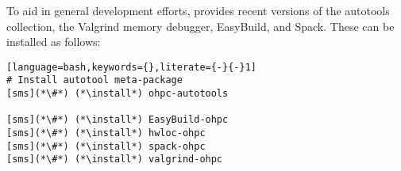 To aid in general development efforts, \OHPC{} provides recent versions of the \GNU{}
autotools collection, the Valgrind memory debugger, EasyBuild, and Spack. These can be installed as follows:

\begin{lstlisting}[language=bash,keywords={},literate={-}{-}1]
# Install autotool meta-package
[sms](*\#*) (*\install*) ohpc-autotools

[sms](*\#*) (*\install*) EasyBuild-ohpc
[sms](*\#*) (*\install*) hwloc-ohpc
[sms](*\#*) (*\install*) spack-ohpc
[sms](*\#*) (*\install*) valgrind-ohpc
\end{lstlisting}
